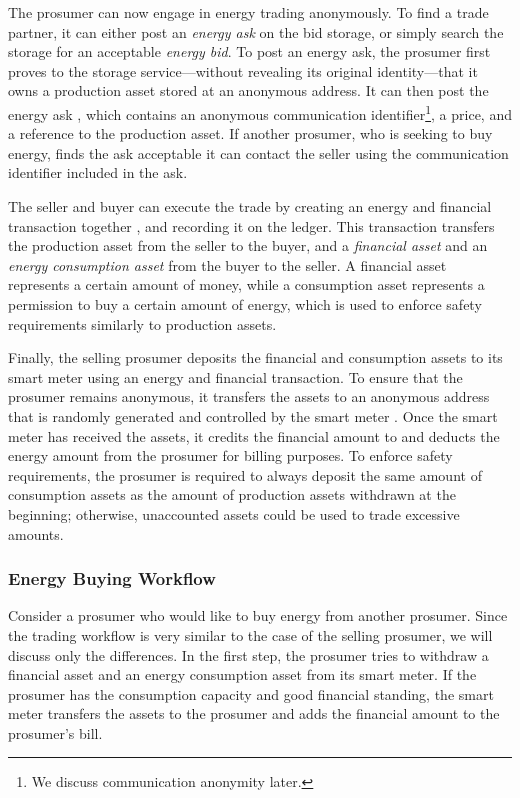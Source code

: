The prosumer can now engage in energy trading anonymously.  To find a
trade partner, it can either post an \emph{energy ask} on the bid
storage, or simply search the storage for an acceptable \emph{energy
  bid}.  To post an energy ask, the prosumer first proves to the
storage service---without revealing its original identity---that it
owns a production asset stored at an anonymous address.  It can then
post the energy ask , which contains an anonymous
communication identifier\footnote{We discuss communication anonymity later.}, a price, and a reference
to the production asset.  If another prosumer, who is seeking to buy energy,
finds the ask acceptable it can contact the seller using the
communication identifier included in the ask.

The seller and buyer can execute the trade by creating an energy and
financial transaction together , and recording it on the
ledger.  This transaction transfers the production asset from the
seller to the buyer, and a \emph{financial asset} and an \emph{energy
  consumption asset} from the buyer to the seller.  A financial asset
represents a certain amount of money, while a consumption asset
represents a permission to buy a certain amount of energy, which is
used to enforce safety requirements similarly to production assets.

Finally, the selling prosumer deposits the financial and consumption
assets to its smart meter using an energy and financial transaction.
To ensure that the prosumer remains anonymous, it transfers the assets
to an anonymous address that is randomly generated and controlled by
the smart meter .  Once the smart meter has received the
assets, it credits the financial amount to and deducts the energy
amount from the prosumer for billing purposes.  To enforce safety
requirements, the prosumer is required to always deposit the same amount of
consumption assets as the amount of production assets withdrawn at the
beginning; otherwise, unaccounted assets could be used to trade
excessive amounts.

\subsubsection{Energy Buying Workflow}
Consider a prosumer who would like to buy energy from another prosumer.
Since the trading workflow is very similar to the case of the selling prosumer, we will discuss only the differences.
In the first step, the prosumer tries to withdraw a financial asset and an energy consumption asset from its smart meter.
If the prosumer has the consumption capacity and good financial standing, the smart meter transfers the assets to the prosumer and adds the financial amount to the prosumer's bill.

